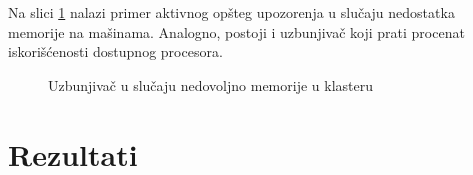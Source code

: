 \documentclass[12pt,oneside]{memoir}
\begin{document}
Na slici \ref{fig:alertmemory} nalazi primer aktivnog opšteg upozorenja u slučaju nedostatka memorije na mašinama. Analogno, postoji i uzbunjivač koji prati procenat iskorišćenosti dostupnog procesora.

\begin{figure}[!ht]
  \centering
  \caption{Uzbunjivač u slučaju nedovoljno memorije u klasteru}
  \label{fig:alertmemory}
\end{figure}


\chapter{Rezultati}
\label{chp:rezultati}
\end{document}
